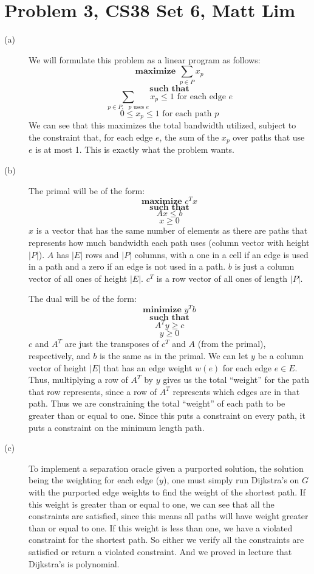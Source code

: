 \documentclass{article}
\begin{document}
\section*{Problem 3, CS38 Set 6, Matt Lim}
\begin{description}
    \item[(a)]
        We will formulate this problem as a linear program as follows:
        \[ \textbf{maximize } \sum_{p \in P} x_p \]
        \[ \textbf{such that} \]
        \[ \sum_{p \in P, \text{ }p \text{ uses } e} x_p \leq 1 \text{ for each edge $e$} \]
        \[ 0 \leq x_p \leq 1 \text{ for each path $p$} \]
        We can see that this maximizes the total bandwidth utilized, subject to
        the constraint that, for each edge $e$, the sum of the $x_p$ over paths
        that use $e$ is at most 1. This is exactly what the problem wants.
    \item[(b)]
        The primal will be of the form:
        \[ \textbf{maximize } c^Tx \]
        \[ \textbf{such that} \]
        \[ Ax \leq b \]
        \[ x \geq 0 \]
        $x$ is a vector that has the same number of elements as there are
        paths that represents how much bandwidth each path uses (column vector
        with height $|P|$). $A$ has $|E|$ rows and $|P|$ columns, with a one in
        a cell if an edge is used in a path and a zero if an edge is not used in a path.
        $b$ is just a column vector of all ones of height $|E|$. $c^T$ is a
        row vector of all ones of length $|P|$.

        \vspace{5mm}

        The dual will be of the form:
        \[ \textbf{minimize } y^Tb \]
        \[ \textbf{such that} \]
        \[ A^Ty \geq c \]
        \[ y \geq 0 \]
        $c$ and $A^T$ are just the transposes of $c^T$ and $A$ (from the
        primal), respectively, and $b$ is the same as in the primal. We
        can let $y$ be a column vector of height $|E|$ that has an edge
        weight $w(e)$ for each edge $e \in E$. Thus, multiplying a row of $A^T$
        by $y$ gives us the total ``weight'' for the path that row represents,
        since a row of $A^T$ represents which edges are in that path. Thus we
        are constraining the total ``weight'' of each path to be greater than or
        equal to one. Since this puts a constraint on every path, it puts a
        constraint on the minimum length path.
    \item[(c)]
        To implement a separation oracle given a purported solution, the
        solution being the weighting for each edge ($y$), one must simply run Dijkstra's on $G$
        with the purported edge weights
        to find the weight of the shortest path. If this weight is greater than
        or equal to one, we can see that all the constraints are satisfied,
        since this means all paths will have weight greater than or equal to
        one. If this weight is less than one, we have a violated constraint for
        the shortest path. So either we verify all the constraints are satisfied
        or return a violated constraint. And we proved in lecture that
        Dijkstra's is polynomial.
\end{description}
\newpage

\end{document}
